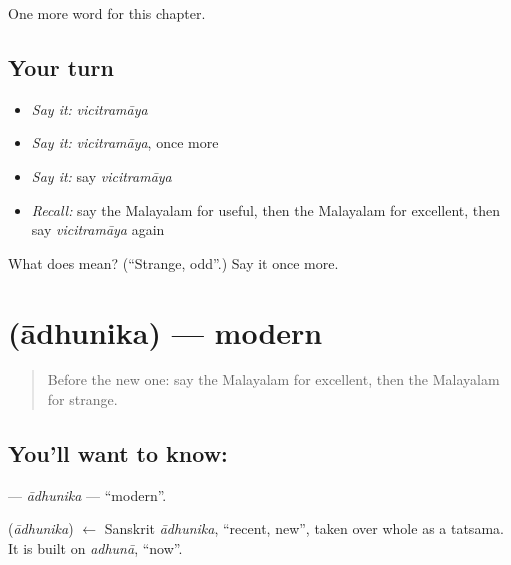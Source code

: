 \begin{grammarlens}[title={What you've built}]
One more word for this chapter.
\end{grammarlens}

\subsection*{Your turn}
\begin{itemize}
\raggedright
  \item \emph{Say it:} \emph{vicitramāya}
  \item \emph{Say it:} \emph{vicitramāya}, once more
  \item \emph{Say it:} say \emph{vicitramāya}
  \item \emph{Recall:} say the Malayalam for useful, then the Malayalam for excellent, then say \emph{vicitramāya} again
\end{itemize}

\begin{tcolorbox}[breakable,colback=teal!4,colframe=teal!35!black,title={Before you move on}]
What does  mean? (\textquotedblleft{}Strange, odd\textquotedblright{}.) Say it once more.
\end{tcolorbox}
\section[\texorpdfstring{\ml{ആധുനിക} (ādhunika)}{ആധുനിക (ādhunika)}]{ (ādhunika) — modern}

\label{lesson:ML-C205-adhunika}



\begin{quote}
Before the new one: say the Malayalam for excellent, then the Malayalam for strange.
\end{quote}

\subsection*{You'll want to know: }
\textbf{} — \emph{ādhunika} — \textquotedblleft{}modern\textquotedblright{}.

\begin{cousinweb}
\textbf{} (\emph{ādhunika}) $\leftarrow$ Sanskrit \emph{ādhunika}, \textquotedblleft{}recent, new\textquotedblright{}, taken over whole as a tatsama. It is built on \emph{adhunā}, \textquotedblleft{}now\textquotedblright{}.
\end{cousinweb}

